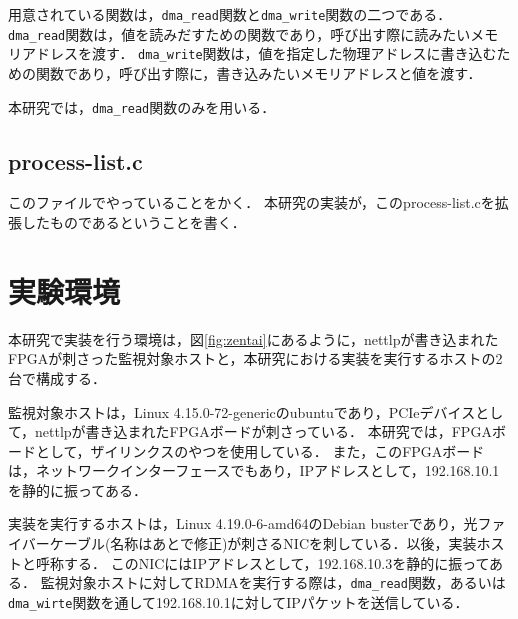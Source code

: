 用意されている関数は，\verb|dma_read|関数と\verb|dma_write|関数の二つである．
\verb|dma_read|関数は，値を読みだすための関数であり，呼び出す際に読みたいメモリアドレスを渡す．
\verb|dma_write|関数は，値を指定した物理アドレスに書き込むための関数であり，呼び出す際に，書き込みたいメモリアドレスと値を渡す．

本研究では，\verb|dma_read|関数のみを用いる．

\subsection{process-list.c}

このファイルでやっていることをかく．
本研究の実装が，このprocess-list.cを拡張したものであるということを書く．

\section{実験環境}

本研究で実装を行う環境は，図\ref{fig:zentai}にあるように，nettlpが書き込まれたFPGAが刺さった監視対象ホストと，本研究における実装を実行するホストの2台で構成する．

監視対象ホストは，Linux 4.15.0-72-genericのubuntuであり，PCIeデバイスとして，nettlpが書き込まれたFPGAボードが刺さっている．
本研究では，FPGAボードとして，ザイリンクスのやつを使用している．
また，このFPGAボードは，ネットワークインターフェースでもあり，IPアドレスとして，192.168.10.1を静的に振ってある．

実装を実行するホストは，Linux 4.19.0-6-amd64のDebian busterであり，光ファイバーケーブル(名称はあとで修正)が刺さるNICを刺している．以後，実装ホストと呼称する．
このNICにはIPアドレスとして，192.168.10.3を静的に振ってある．
監視対象ホストに対してRDMAを実行する際は，\verb|dma_read|関数，あるいは\verb|dma_wirte|関数を通して192.168.10.1に対してIPパケットを送信している．

